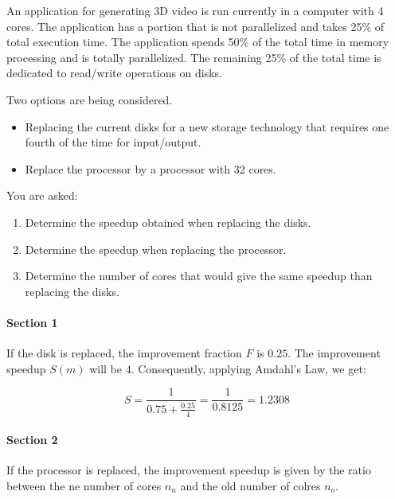 \begin{acexercise}\end{acexercise}

An application for generating 3D video is run currently in a computer with 4
cores. The application has a portion that is not parallelized and takes 25\% of
total execution time. The application spends 50\% of the total time in memory
processing and is totally parallelized. The remaining 25\% of the total time is
dedicated to read/write operations on disks.

Two options are being considered.

\begin{itemize}
\item Replacing the current disks for a new storage technology that requires one fourth of the time for input/output.
\item Replace the processor by a processor with 32 cores.
\end{itemize}

You are asked:

\begin{enumerate}
\item Determine the speedup obtained when replacing the disks.
\item Determine the speedup when replacing the processor.
\item Determine the number of cores that would give the same speedup than replacing the disks.
\end{enumerate}


\begin{acsolution}\end{acsolution}

\paragraph{Section 1}
If the disk is replaced, the improvement fraction $F$ is $0.25$.
The improvement speedup $S(m)$ will be $4$.
Consequently, applying Amdahl's Law, we get:

\[
S = \frac{1}{0.75 + \frac{0.25}{4}} = \frac{1}{0.8125} =  1.2308
\]

\paragraph{Section 2}
If the processor is replaced, the improvement speedup is given by the ratio
between the ne number of cores $n_n$ and the old number of colres $n_o$.

